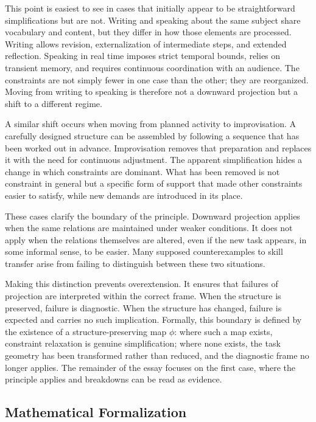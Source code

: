 \documentclass[12pt, a4paper]{article}
\begin{document}
This point is easiest to see in cases that initially appear to be straightforward simplifications but are not. Writing and speaking about the same subject share vocabulary and content, but they differ in how those elements are processed. Writing allows revision, externalization of intermediate steps, and extended reflection. Speaking in real time imposes strict temporal bounds, relies on transient memory, and requires continuous coordination with an audience. The constraints are not simply fewer in one case than the other; they are reorganized. Moving from writing to speaking is therefore not a downward projection but a shift to a different regime.

A similar shift occurs when moving from planned activity to improvisation. A carefully designed structure can be assembled by following a sequence that has been worked out in advance. Improvisation removes that preparation and replaces it with the need for continuous adjustment. The apparent simplification hides a change in which constraints are dominant. What has been removed is not constraint in general but a specific form of support that made other constraints easier to satisfy, while new demands are introduced in its place.

These cases clarify the boundary of the principle. Downward projection applies when the same relations are maintained under weaker conditions. It does not apply when the relations themselves are altered, even if the new task appears, in some informal sense, to be easier. Many supposed counterexamples to skill transfer arise from failing to distinguish between these two situations.

Making this distinction prevents overextension. It ensures that failures of projection are interpreted within the correct frame. When the structure is preserved, failure is diagnostic. When the structure has changed, failure is expected and carries no such implication. Formally, this boundary is defined by the existence of a structure-preserving map $\phi$: where such a map exists, constraint relaxation is genuine simplification; where none exists, the task geometry has been transformed rather than reduced, and the diagnostic frame no longer applies. The remainder of the essay focuses on the first case, where the principle applies and breakdowns can be read as evidence.

\subsection*{Mathematical Formalization}
\end{document}

